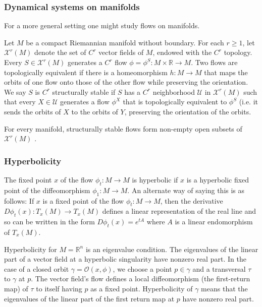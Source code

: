 \documentclass{article}
\newcommand{\reals}{\mathbb{R}}
\newcommand{\mcU}{\mathcal{U}}
\newcommand{\mcX}{\mathcal{X}}
\newcounter{ct}
\begin{document}
\subsubsection{Dynamical systems on manifolds}
For a more general setting one might study flows on manifolds.
\begin{definition}
Let $M$ be a compact Riemannian manifold without boundary. For each $r\geq 1$, let $\mcX^r(M)$ denote the set of $C^r$ vector fields of $M$, endowed with the $C^r$ topology. Every $S\in \mcX^r(M)$ generates a $C^r$ flow $\phi=\phi^S\colon M\times \reals\rightarrow M$.
Two flows are topologically equivalent if there is a homeomorphism $h\colon M\rightarrow M$ that maps the orbits of one flow onto those of the other flow while preserving the orientation. 
 We say $S$ is $C^r$ structurally stable if $S$ has a $C^r$ neighborhood $\mcU$ in $\mcX^r(M)$ such that every $X \in \mcU$ generates a flow $\phi^X$ that is topologically equivalent to $\phi^S$ (i.e. it sends the orbits of $X$ to the orbits of $Y$, preserving the orientation of the orbits.
\end{definition}

\begin{remark}
For every manifold, structurally stable flows form non-empty open subsets of $\mcX^r(M)$  \citep{palis1970ss}.
\end{remark}

\subsubsection{Hyperbolicity}
The fixed point $x$ of the flow $\phi_t\colon M\rightarrow M$ is hyperbolic if $x$ is a hyperbolic fixed point of the diffeomorphism $\phi_1: M\rightarrow M$.
 An alternate way of saying this is as follows: If $x$ is a fixed point of the flow $\phi_t\colon M\rightarrow M$, then the derivative $D\phi_t(x)\colon T_x(M)\rightarrow T_x(M)$ defines a linear representation of the real line and so can be written in the form $D\phi_t(x)=e^{tA}$ where $A$ is a linear endomorphism of $T_x(M)$.


Hyperbolicity for $M=\reals^n$ is an eigenvalue condition.
The eigenvalues of the linear part of a vector field at a hyperbolic singularity have nonzero real part.
In the case of a closed orbit $\gamma=\mathcal{O}(x,\phi)$, we choose a point $p\in\gamma$ and a transversal $\tau$ to $\gamma$ at $p$.
The vector field's flow defines a local diffeomorphism (the first-return map) of $\tau$ to itself having $p$ as a fixed point.
Hyperbolicity of $\gamma$ means that the eigenvalues of the linear part of the first return map at $p$ have nonzero real part.
   
\end{document}
